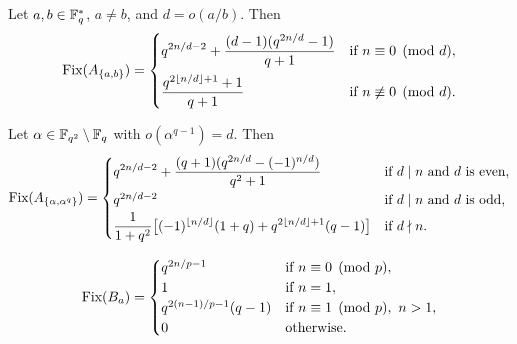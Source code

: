 \documentclass[10pt,a4paper]{amsart}
\newcommand{\f}{\Bbb F}
\begin{document}
\begin{thm}\label{T2.1}
Let $a,b\in\f_q^*$, $a\ne b$, and $d=o(a/b)$. Then
\[
\text{\rm Fix}(A_{\{a,b\}})=\begin{cases}
\displaystyle q^{2n/d-2}+\frac{(d-1)(q^{2n/d}-1)}{q+1}&\text{if}\ n\equiv 0\pmod d,\vspace{0.5em}\cr
\displaystyle \frac{q^{2\lfloor n/d\rfloor+1}+1}{q+1}&\text{if}\ n\not\equiv 0\pmod d.
\end{cases}
\]
\end{thm}

\begin{thm}\label{T2.2}
Let $\alpha\in\f_{q^2}\setminus\f_q$ with $o(\alpha^{q-1})=d$. Then
\[
\text{\rm Fix}(A_{\{\alpha,\alpha^q\}})=\begin{cases}
\displaystyle q^{2n/d-2}+\frac{(q+1)(q^{2n/d}-(-1)^{n/d})}{q^2+1}&\text{if $d\mid n$ and $d$ is even},\vspace{0.2em}\cr
q^{2n/d-2}&\text{if $d\mid n$ and $d$ is odd},\vspace{0.2em}\cr
\displaystyle \frac 1{1+q^2}\bigl[(-1)^{\lfloor n/d\rfloor}(1+q)+q^{2\lfloor n/d\rfloor+1}(q-1)\bigr]&\text{if $d\nmid n$}.
\end{cases}
\]
\end{thm}

\begin{equation}\label{FixBa}
\text{Fix}(B_a)=\begin{cases}
q^{2n/p-1}&\text{if}\ n\equiv 0\pmod p,\cr
1&\text{if}\ n=1,\cr
q^{2(n-1)/p-1}(q-1)&\text{if}\ n\equiv 1\pmod p,\ n>1,\cr
0&\text{otherwise}.
\end{cases}
\end{equation}
\end{document}
